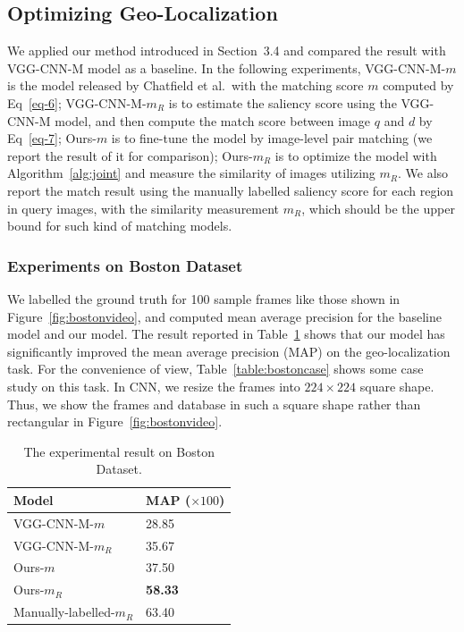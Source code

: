 \subsection{Optimizing Geo-Localization}
\par
We applied our method introduced in Section~3.4 and compared the result with VGG-CNN-M model as a baseline. In the following experiments, VGG-CNN-M-$m$ is the model released by Chatfield et al.~\cite{chatfield2014return}with the matching score $m$ computed by Eq~\eqref{eq-6}; VGG-CNN-M-$m_R$ is to estimate the saliency score using the VGG-CNN-M model, and then compute the match score between image $q$ and $d$ by Eq~\eqref{eq-7}; Ours-$m$ is to fine-tune the model by image-level pair matching (we report the result of it for comparison); Ours-$m_R$ is to optimize the model with Algorithm~\ref{alg:joint} and measure the similarity of images utilizing $m_R$. We also report the match result using the manually labelled saliency score for each region in query images, with the similarity measurement $m_R$, which should be the upper bound for such kind of matching models. 
\subsubsection{Experiments on Boston Dataset}
\par
We labelled the ground truth for 100 sample frames like those shown in Figure~\ref{fig:bostonvideo}, and computed mean average precision for the baseline model and our model. The result reported in Table~\ref{table:bostonresult} shows that our model has significantly improved the mean average precision (MAP) on the geo-localization task. For the convenience of view, Table~\ref{table:bostoncase} shows some case study on this task. In CNN, we resize the frames into $224 \times 224$ square shape. Thus, we show the frames and database in such a square shape rather than rectangular in Figure~\ref{fig:bostonvideo}.
\begin{table}[htbp]
\begin{tabular}{|l|l|}
\hline
Model & MAP ($\times 100$) \\
\hline \hline
VGG-CNN-M-$m$ & 28.85\\
VGG-CNN-M-$m_R$ & 35.67 \\
Ours-$m$ & 37.50 \\
Ours-$m_R$ & \textbf{58.33} \\
Manually-labelled-$m_R$ & 63.40 \\
\hline
\end{tabular}
\caption{The experimental result on Boston Dataset.}
\label{table:bostonresult}
\end{table}

